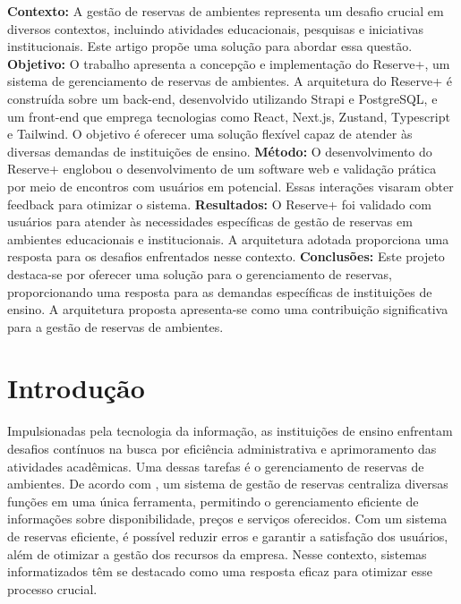 \documentclass[12pt]{article}
\begin{document}
\begin{resumo} 
\textbf{Contexto:} A gestão de reservas de ambientes representa um desafio crucial em diversos contextos, incluindo atividades educacionais, pesquisas e iniciativas institucionais. Este artigo propõe uma solução para abordar essa questão. \textbf{Objetivo:} O trabalho apresenta a concepção e implementação do Reserve+, um sistema de gerenciamento de reservas de ambientes. A arquitetura do Reserve+ é construída sobre um back-end, desenvolvido utilizando Strapi e PostgreSQL, e um front-end que emprega tecnologias como React, Next.js, Zustand, Typescript e Tailwind. O objetivo é oferecer uma solução flexível capaz de atender às diversas demandas de instituições de ensino. \textbf{Método:} O desenvolvimento do Reserve+ englobou o desenvolvimento de um software web e validação prática por meio de encontros com usuários em potencial. Essas interações visaram obter feedback para otimizar o sistema. \textbf{Resultados:} O Reserve+ foi validado com usuários para atender às necessidades específicas de gestão de reservas em ambientes educacionais e institucionais. A arquitetura adotada proporciona uma resposta para os desafios enfrentados nesse contexto. \textbf{Conclusões:} Este projeto destaca-se por oferecer uma solução para o gerenciamento de reservas, proporcionando uma resposta para as demandas específicas de instituições de ensino. A arquitetura proposta apresenta-se como uma contribuição significativa para a gestão de reservas de ambientes.
\end{resumo}


\section{Introdução}

Impulsionadas pela tecnologia da informação, as instituições de ensino enfrentam desafios contínuos na busca por eficiência administrativa e aprimoramento das atividades acadêmicas. Uma dessas tarefas é o gerenciamento de reservas de ambientes. De acordo com \cite{sistemas}, um sistema de gestão de reservas centraliza diversas funções em uma única ferramenta, permitindo o gerenciamento eficiente de informações sobre disponibilidade, preços e serviços oferecidos. Com um sistema de reservas eficiente, é possível reduzir erros e garantir a satisfação dos usuários, além de otimizar a gestão dos recursos da empresa. Nesse contexto, sistemas informatizados têm se destacado como uma resposta eficaz para otimizar esse processo crucial.
\end{document}
